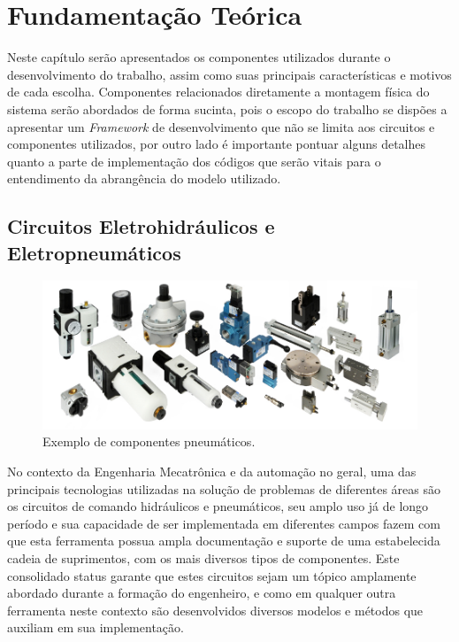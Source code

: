 \chapter[Fundamentação Teórica]{Fundamentação Teórica}

Neste capítulo serão apresentados os componentes utilizados durante o desenvolvimento do trabalho, assim como suas 
principais características e motivos de cada escolha. Componentes relacionados diretamente a montagem física do sistema
serão abordados de forma sucinta, pois o escopo do trabalho se dispões a apresentar um \textit{Framework} de desenvolvimento
que não se limita aos circuitos e componentes utilizados, por outro lado é importante pontuar alguns detalhes quanto a 
parte de implementação dos códigos que serão vitais para o entendimento da abrangência do modelo utilizado.

\section{Circuitos Eletrohidráulicos e Eletropneumáticos}

\begin{figure}[htb]
    \begin{center}
	    \includegraphics[scale=0.5]{figs/set-pneumatica.jpg}
	\end{center}
	\caption{Exemplo de componentes pneumáticos.} 
\end{figure}

No contexto da Engenharia Mecatrônica e da automação no geral, uma das principais tecnologias utilizadas na solução de
problemas de diferentes áreas são os circuitos de comando hidráulicos e pneumáticos, seu amplo uso já de longo período e
sua capacidade de ser implementada em diferentes campos fazem com que esta ferramenta possua ampla documentação e suporte
de uma estabelecida cadeia de suprimentos, com os mais diversos tipos de componentes. Este consolidado status garante 
que estes circuitos sejam um tópico amplamente abordado durante a formação do engenheiro, e como em qualquer outra 
ferramenta neste contexto são desenvolvidos diversos modelos e métodos que auxiliam em sua implementação. 

